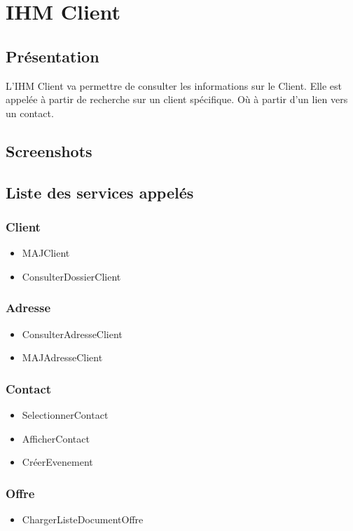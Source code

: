 \section{IHM Client}

\subsection{Présentation}

L'IHM Client va permettre de consulter les informations sur le Client.
Elle est appelée à partir de recherche sur un client spécifique. Où à partir d'un lien vers un contact.

\subsection{Screenshots}

\subsection{Liste des services appelés}

\subsubsection{Client}
\begin{itemize}
\item MAJClient
\item ConsulterDossierClient
\end{itemize}

\subsubsection{Adresse}
\begin{itemize}
\item ConsulterAdresseClient
\item MAJAdresseClient
\end{itemize}

\subsubsection{Contact}
\begin{itemize}
\item SelectionnerContact
\item AfficherContact
\item CréerEvenement
\end{itemize}

\subsubsection{Offre}
\begin{itemize}
\item ChargerListeDocumentOffre
\end{itemize}



